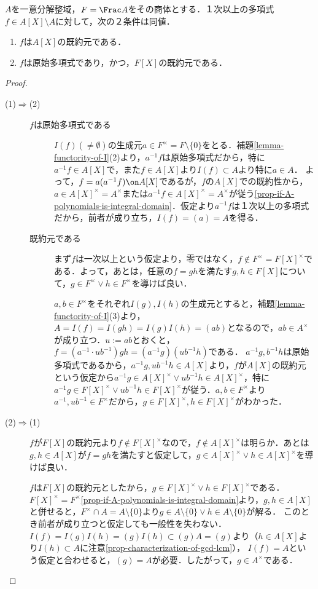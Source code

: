 \documentclass[uplatex,dvipdfmx]{jsreport}
\begin{document}
\begin{theorem}\label{thm-Gauss}
    $A$を一意分解整域，$F=\Frac A$をその商体とする．１次以上の多項式$f\in A[X]\setminus A$に対して，次の２条件は同値．
    \begin{enumerate}
        \item $f$は$A[X]$の既約元である．
        \item $f$は原始多項式であり，かつ，$F[X]$の既約元である．
    \end{enumerate}
\end{theorem}
\begin{proof}\mbox{}
    \begin{description}
        \item[(1)$\Rightarrow$(2)] 
        \begin{description}
            \item[$f$は原始多項式である] 
            $I(f)(\ne\emptyset)$の生成元$a\in F^\times=F\setminus\{0\}$をとる．補題\ref{lemma-functority-of-I}(2)より，$a^{-1}f$は原始多項式だから，特に$a^{-1}f\in A[X]$で，また$f\in A[X]$より$I(f)\subset A$より特に$a\in A$．
            よって，$f=a(a^{-1}f)\on A[X]$であるが，$f$の$A[X]$での既約性から，$a\in A[X]^\times=A^\times$または$a^{-1}f\in A[X]^\times=A^\times$が従う\ref{prop-if-A-polynomials-is-integral-domain}．仮定より$a^{-1}f$は１次以上の多項式だから，前者が成り立ち，$I(f)=(a)=A$を得る．
            \item[既約元である]
            まず$f$は一次以上という仮定より，零ではなく，$f\notin F^\times=F[X]^\times$である．よって，あとは，任意の$f=gh$を満たす$g,h\in F[X]$について，$g\in F^\times\lor h\in F^\times$を導けば良い．

            $a,b\in F^\times$をそれぞれ$I(g),I(h)$の生成元とすると，補題\ref{lemma-functority-of-I}(3)より，
            $A=I(f)=I(gh)=I(g)I(h)=(ab)$となるので，$ab\in A^\times$が成り立つ．$u:=ab$とおくと，$f=(a^{-1}\cdot ub^{-1})gh=(a^{-1}g)(ub^{-1}h)$である．
            $a^{-1}g,b^{-1}h$は原始多項式であるから，$a^{-1}g,ub^{-1}h\in A[X]$より，$f$が$A[X]$の既約元という仮定から$a^{-1}g\in A[X]^\times\lor ub^{-1}h\in A[X]^\times$，特に$a^{-1}g\in F[X]^\times\lor ub^{-1}h\in F[X]^\times$が従う．$a,b\in F^\times$より$a^{-1},ub^{-1}\in F^\times$だから，$g\in F[X]^\times,h\in F[X]^\times$がわかった．
        \end{description}
        \item[(2)$\Rightarrow$(1)]
        $f$が$F[X]$の既約元より$f\notin F[X]^\times$なので，$f\notin A[X]^\times$は明らか．あとは$g,h\in A[X]$が$f=gh$を満たすと仮定して，$g\in A[X]^\times\lor h\in A[X]^\times$を導けば良い．

        $f$は$F[X]$の既約元としたから，$g\in F[X]^\times\lor h\in F[X]^\times$である．$F[X]^\times=F^\times$\ref{prop-if-A-polynomials-is-integral-domain}より，$g,h\in A[X]$と併せると，$F^\times\cap A=A\setminus\{0\}$より$g\in A\setminus\{0\}\lor h\in A\setminus\{0\}$が解る．
        このとき前者が成り立つと仮定しても一般性を失わない．$I(f)=I(g)I(h)=(g)I(h)\subset(g)A=(g)$より（$h\in A[X]$より$I(h)\subset A$に注意\ref{prop-characterization-of-gcd-lcm}），
        $I(f)=A$という仮定と合わせると，$(g)=A$が必要．したがって，$g\in A^\times$である．
    \end{description}
\end{proof}
\end{document}
